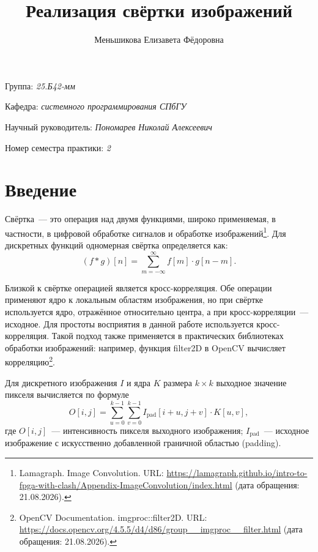 \documentclass[a4paper]{article}
\title{Реализация свёртки изображений}
\author{Меньшикова Елизавета Фёдоровна}
\date{}
\begin{document}
\maketitle

\begin{flushright}
    Группа: \emph{25.Б42-мм}

    Кафедра: \emph{системного программирования СПбГУ}

    Научный руководитель: \emph{Пономарев Николай Алексеевич}
    
    Номер семестра практики: \emph{2}
\end{flushright} 

\section{Введение}

Свёртка~--- это операция над двумя функциями, широко применяемая, в частности, в цифровой обработке сигналов и обработке изображений\footnote{Lamagraph. Image Convolution. URL: \url{https://lamagraph.github.io/intro-to-fpga-with-clash/Appendix-ImageConvolution/index.html} (дата обращения: 21.08.2026).}. Для дискретных функций одномерная свёртка определяется как:
\begin{equation*}
    (f * g)[n] = \sum_{m=-\infty}^{\infty} f[m] \cdot g[n - m].
\end{equation*}

Близкой к свёртке операцией является кросс-корреляция. Обе операции применяют ядро к локальным областям изображения, но при свёртке используется ядро, отражённое относительно центра, а при кросс-корреляции~--- исходное. Для простоты восприятия в данной работе используется кросс-корреляция. Такой подход также применяется в практических библиотеках обработки изображений: например, функция filter2D в OpenCV вычисляет корреляцию\footnote{OpenCV Documentation. imgproc::filter2D. URL: \url{https://docs.opencv.org/4.5.5/d4/d86/group__imgproc__filter.html} (дата обращения: 21.08.2026).}.

Для дискретного изображения $I$ и ядра $K$ размера $k \times k$ выходное значение пикселя вычисляется по формуле
\begin{equation*}
    O[i, j] = \sum_{u=0}^{k-1} \sum_{v=0}^{k-1} I_{\text{pad}}[i + u, j + v] \cdot K[u, v],
\end{equation*}
где $O[i,j]$~--- интенсивность пикселя выходного изображения; $I_{\text{pad}}$~--- исходное изображение с искусственно добавленной граничной областью (padding).
\end{document}
